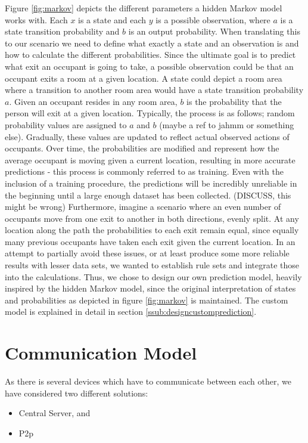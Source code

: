 Figure \ref{fig:markov} depicts the different parameters a hidden Markov model works with. Each \(x\) is a state and each \(y\) is a possible observation, where \(a\) is a state transition probability and \(b\) is an output probability. When translating this to our scenario we need to define what exactly a state and an observation is and how to calculate the different probabilities. Since the ultimate goal is to predict what exit an occupant is going to take, a possible observation could be that an occupant exits a room at a given location. A state could depict a room area where a transition to another room area would have a state transition probability \(a\). Given an occupant resides in any room area, \(b\) is the probability that the person will exit at a given location. Typically, the process is as follows; random probability values are assigned to \(a\) and \(b\) (maybe a ref to jahmm or something else). Gradually, these values are updated to reflect actual observed actions of occupants. Over time, the probabilities are modified and represent how the average occupant is moving given a current location, resulting in more accurate predictions - this process is commonly referred to as training. Even with the inclusion of a training procedure, the predictions will be incredibly unreliable in the beginning until a large enough dataset has been collected. (DISCUSS, this might be wrong) Furthermore, imagine a scenario where an even number of occupants move from one exit to another in both directions, evenly split. At any location along the path the probabilities to each exit remain equal, since equally many previous occupants have taken each exit given the current location. In an attempt to partially avoid these issues, or at least produce some more reliable results with lesser data sets, we wanted to establish rule sets and integrate those into the calculations. Thus, we chose to design our own prediction model, heavily inspired by the hidden Markov model, since the original interpretation of states and probabilities as depicted in figure \ref{fig:markov} is maintained. The custom model is explained in detail in section \ref{ssub:designcustomprediction}. 

\section{Communication Model}
As there is several devices which have to communicate between each other, we have considered two different solutions:

\begin{itemize}
\item Central Server, and
\item P2p
\end{itemize}

